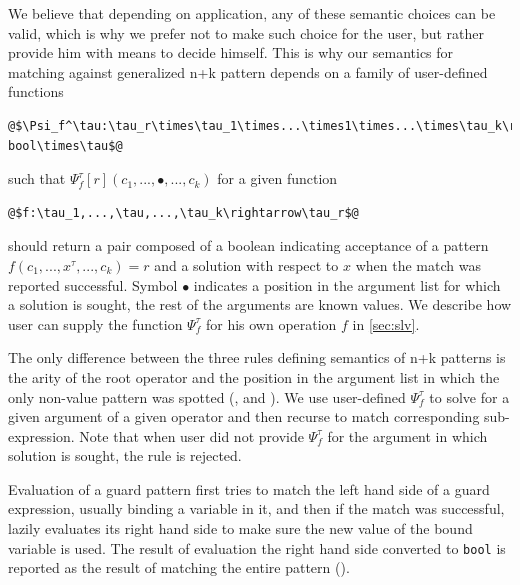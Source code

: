 \documentclass[preprint]{sigplanconf}
\makeatletter
\DeclareRobustCommand{\code}[1]{{\lstinline[breaklines=false,escapechar=@]{#1}}}
\makeatother
\begin{document}
\noindent
We believe that depending on application, any of these semantic choices can be 
valid, which is why we prefer not to make such choice for the user, but rather 
provide him with means to decide himself. This is why our semantics for matching 
against generalized n+k pattern depends on a family of user-defined functions 

\begin{lstlisting}
@$\Psi_f^\tau:\tau_r\times\tau_1\times...\times1\times...\times\tau_k\rightarrow bool\times\tau$@
\end{lstlisting} 

\noindent
such that $\Psi_f^\tau[r](c_1,...,\bullet,...,c_k)$ for a given function 

\begin{lstlisting}
@$f:\tau_1,...,\tau,...,\tau_k\rightarrow\tau_r$@
\end{lstlisting} 

\noindent should return a pair composed of a boolean indicating acceptance of a 
pattern $f(c_1,...,x^\tau,...,c_k)=r$ and a solution with respect to $x$ 
when the match was reported successful. Symbol $\bullet$ indicates a position in 
the argument list for which a solution is sought, the rest of the arguments are 
known values. We describe how user can supply the function $\Psi_f^\tau$ for his 
own operation $f$ in \textsection\ref{sec:slv}.

The only difference between the three rules defining semantics of n+k patterns 
is the arity of the root operator and the position in the argument list in which 
the only non-value pattern was spotted (, 
 and ). We use user-defined 
$\Psi_f^\tau$ to solve for a given argument of a given operator and then recurse 
to match corresponding sub-expression. Note that when user did not provide 
$\Psi_f^\tau$ for the argument in which solution is sought, the rule is 
rejected.

Evaluation of a guard pattern first tries to match the left hand side of a guard 
expression, usually binding a variable in it, and then if the match was 
successful, lazily evaluates its right hand side to make sure the new value of 
the bound variable is used. The result of evaluation the right hand side 
converted to \code{bool} is reported as the result of matching the entire 
pattern ().
\end{document}

